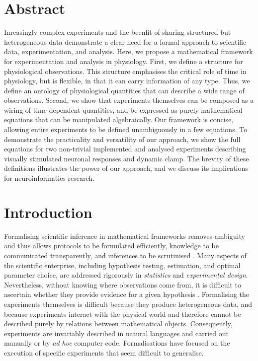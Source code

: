 \section*{Abstract}

Inreasingly complex experiments and the beenfit of sharing structured
but heterogeneous data demonstrate a clear need for a formal approach
to scientific data, experimentation, and analysis.  Here, we propose a
mathematical framework for experimentation and analysis in
physiology. First, we define a structure for physiological
observations. This structure emphasises the critical role of time in
physiology, but is flexible, in that it can carry information of any
type. Thus, we define an ontology of physiological quantities that can
describe a wide range of observations. Second, we show that
experiments themselves can be composed as a wiring of time-dependent
quantities, and be expressed as purely mathematical equations that can
be manipulated algebraically. Our framework is concise, allowing
entire experiments to be defined unambiguously in a few equations. To
demonstrate the practicality and versatility of our approach, we show
the full equations for two non-trivial implemented and analysed
experiments describing visually stimulated neuronal responses and
dynamic clamp. The brevity of these definitions illustrates the power
of our approach, and we discuss its implications for neuroinformatics
research.

\section*{Introduction}

Formalising scientific inference in mathematical frameworks removes
ambiguity and thus allows protocols to be formulated efficiently,
knowledge to be communicated transparently, and inferences to be
scrutinised \citep{Soldatova2006, Jaynes2003, Krantz1971}. Many
aspects of the scientific enterprise, including hypothesis testing,
estimation, and optimal parameter choice, are addressed rigorously in
\emph{statistics} and \emph{experimental design}. Nevertheless,
without knowing where observations come from, it is difficult to
ascertain whether they provide evidence for a given hypothesis
\citep{Tukey1962}. Formalising the experiments themselves is difficult
because they produce heterogeneous data, and because experiments
interact with the physical world and therefore cannot be described
purely by relations between mathematical objects. Consequently,
experiments are invariably described in natural languages and carried
out manually or by \emph{ad hoc} computer code. Formalisations have
focused on the execution of specific experiments \citep{Jenkins1989,
  Manduchi1990, King2004} that seem difficult to generalise.

